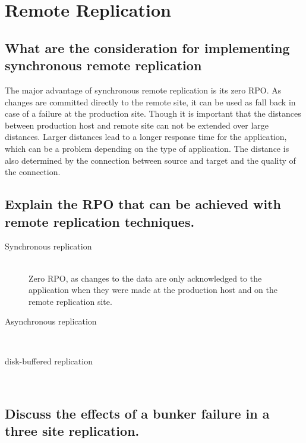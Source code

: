 \section{Remote Replication} %
\label{sec:remote_replication}

\subsection{What are the consideration for implementing synchronous remote replication} %
\label{sub:what_are_the_consideration_for_implementing_synchronous_remote_replication}
	The major advantage of synchronous remote replication is its zero RPO.
	As changes are committed directly to the remote site,
	it can be used as fall back in case of a failure at the production site.
	Though it is important that the distances between production host
	and remote site can not be extended over large distances.
	Larger distances lead to a longer response time for the application,
	which can be a problem depending on the type of application.
	The distance is also determined by the connection between source and target
	and the quality of the connection.

\subsection{Explain the RPO that can be achieved with remote replication techniques.} %
\label{sub:explain_the_rpo_that_can_be_achieved_with_remote_replication_techniques}

	\begin{description}
		\item[Synchronous replication] \hfill \\
			Zero RPO, as changes to the data are only acknowledged to
			the application when they were made at the production host
			and on the remote replication site.
		\item[Asynchronous replication] \hfill \\
			
		\item[disk-buffered replication] \hfill \\
	\end{description}


\subsection{Discuss the effects of a bunker failure in a three site replication.} %
\label{sub:discuss_the_effects_of_a_bunker_failure}


